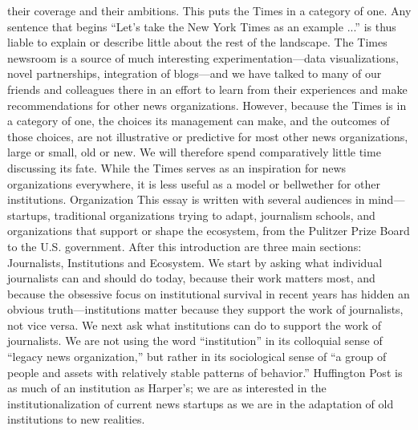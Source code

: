 their coverage and their ambitions. This puts the Times in a category of one. Any
sentence that begins ``Let’s take the New York Times as an example ...'' is thus
liable to explain or describe little about the rest of the landscape.
The Times newsroom is a source of much interesting experimentation—data
visualizations, novel partnerships, integration of blogs—and we have talked to
many of our friends and colleagues there in an effort to learn from their experiences
and make recommendations for other news organizations. However,
because the Times is in a category of one, the choices its management can make,
and the outcomes of those choices, are not illustrative or predictive for most
other news organizations, large or small, old or new. We will therefore spend
comparatively little time discussing its fate. While the Times serves as an inspiration
for news organizations everywhere, it is less useful as a model or bellwether
for other institutions.
Organization
This essay is written with several audiences in mind—startups, traditional organizations
trying to adapt, journalism schools, and organizations that support or
shape the ecosystem, from the Pulitzer Prize Board to the U.S. government.
After this introduction are three main sections: Journalists, Institutions
and Ecosystem.
We start by asking what individual journalists can and should do today, because
their work matters most, and because the obsessive focus on institutional survival
in recent years has hidden an obvious truth—institutions matter because they
support the work of journalists, not vice versa.
We next ask what institutions can do to support the work of journalists. We are
not using the word ``institution'' in its colloquial sense of ``legacy news organization,''
but rather in its sociological sense of ``a group of people and assets with
relatively stable patterns of behavior.'' Huffington Post is as much of an institution
as Harper’s; we are as interested in the institutionalization of current news
startups as we are in the adaptation of old institutions to new realities.

